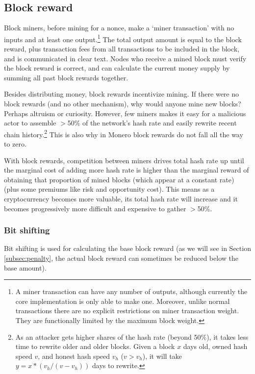 \subsection{Block reward}
\label{subsec:block-reward} %

Block miners, before mining for a nonce, make a `miner transaction' with no inputs and at least one output.\footnote{A miner transaction can have any number of outputs, although currently the core implementation is only able to make one. Moreover, unlike normal transactions there are no explicit restrictions on miner transaction weight. They are functionally limited by the maximum block weight.} The total output amount is equal to the block reward, plus transaction fees from all transactions to be included in the block, and is communicated in clear text. Nodes who receive a mined block must verify the block reward is correct, and can calculate the current money supply by summing all past block rewards together.

Besides distributing money, block rewards incentivize mining. If there were no block rewards (and no other mechanism), why would anyone mine new blocks? Perhaps altruism or curiosity. However, few miners makes it easy for a malicious actor to assemble $>$50\% of the network's hash rate and easily rewrite recent chain history.\footnote{As an attacker gets higher shares of the hash rate (beyond 50\%), it takes less time to rewrite older and older blocks. Given a block $x$ days old, owned hash speed $v$, and honest hash speed $v_h$ ($v > v_h$), it will take $y = x*(v_h/(v-v_h))$ days to rewrite.} This is also why in Monero block rewards do not fall all the way to zero.

With block rewards, competition between miners drives total hash rate up until the marginal cost of adding more hash rate is higher than the marginal reward of obtaining that proportion of mined blocks (which appear at a constant rate) (plus some premiums like risk and opportunity cost). This means as a cryptocurrency becomes more valuable, its total hash rate will increase and it becomes progressively more difficult and expensive to gather $>$50\%.

\subsubsection*{Bit shifting}

Bit shifting is used for calculating the base block reward (as we will see in Section \ref{subsec:penalty}, the actual block reward can sometimes be reduced below the base amount). 

